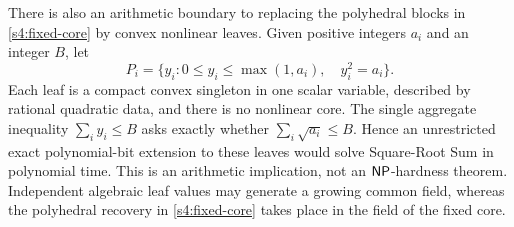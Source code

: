 There is also an arithmetic boundary to replacing the polyhedral blocks
in \cref{s4:fixed-core} by convex nonlinear leaves. Given positive
integers $a_i$ and an integer $B$, let
\[
 P_i=\{y_i:0\le y_i\le\max(1,a_i),\quad y_i^2=a_i\}.
\]
Each leaf is a compact convex singleton in one scalar variable, described by
rational quadratic data, and there is no nonlinear core. The single
aggregate inequality $\sum_i y_i\le B$ asks exactly whether
$\sum_i\sqrt{a_i}\le B$. Hence an unrestricted exact polynomial-bit
extension to these leaves would solve Square-Root Sum in polynomial time.
This is an arithmetic implication, not an $\mathsf{NP}$-hardness theorem.
Independent algebraic leaf values may generate a growing common field,
whereas the polyhedral recovery in \cref{s4:fixed-core} takes place in
the field of the fixed core.

